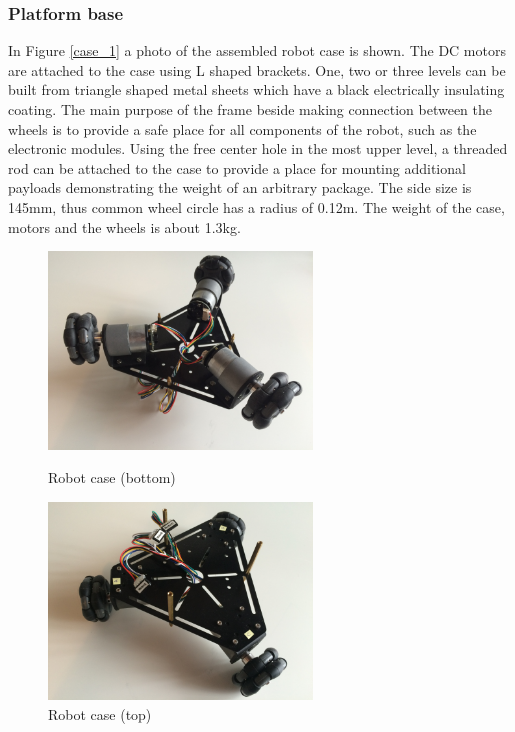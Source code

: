 \documentclass[12pt,english,twoside]{article}
\begin{document}
\subsubsection{Platform base}
In Figure \ref{case_1} a photo of the assembled robot case is shown. The DC motors are attached to the case using L shaped brackets. One, two or three levels can be built from triangle shaped metal sheets which have a black electrically insulating coating. The main purpose of the frame beside making connection between the wheels is to provide a safe place for all components of the robot, such as the electronic modules. Using the free center hole in the most upper level, a threaded rod can be attached to the case to provide a place for mounting additional payloads demonstrating the weight of an arbitrary package. The side size is 145mm, thus common wheel circle has a radius of 0.12m. The weight of the case, motors and the wheels is about 1.3kg.
\begin{figure}[htb!]
	\centering
	\centering
	\includegraphics[width=7cm]{figures/case_1}
	\caption{Robot case (bottom)}
	\label{case_1}
	\endminipage\hfill
	\centering
	\includegraphics[width=7cm]{figures/case_2}
	\caption{Robot case (top)}
	\label{case_2}
	\endminipage\hfill
\end{figure}
\end{document}
